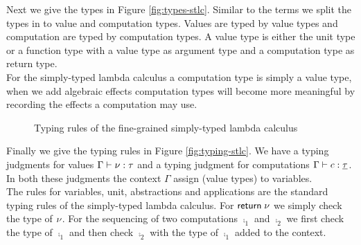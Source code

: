 {Next we give the types in Figure \ref{fig:types-stlc}.
Similar to the terms we split the types in to value and computation types.
Values are typed by value types and computation are typed by computation types.
A value type is either the unit type or a function type with a value type as argument type and a computation type as return type.\\
For the simply-typed lambda calculus a computation type is simply a value type, when we add algebraic effects computation types will become more meaningful by recording the effects a computation may use.

\begin{figure}
\caption{Typing rules of the fine-grained simply-typed lambda calculus}
\centering
{}
\end{figure}

Finally we give the typing rules in Figure \ref{fig:typing-stlc}.
We have a typing judgments for values $\Gamma \vdash \nu : \tau$ and a typing judgment for computations $\Gamma \vdash c : \underline{\tau}$.
In both these judgments the context $\Gamma$ assign (value types) to variables.\\
The rules for variables, unit, abstractions and applications are the standard typing rules of the simply-typed lambda calculus.
For $\mathsf{return} \; \nu$ we simply check the type of $\nu$.
For the sequencing of two computations $\comp_1$ and $\comp_2$ we first check the type of $\comp_1$ and then check $\comp_2$ with the type of $\comp_1$ added to the context.

}
